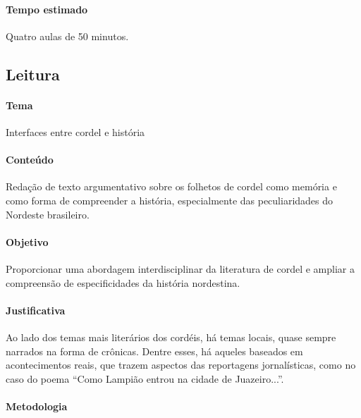 \documentclass[12pt]{extarticle}
\begin{document}
\paragraph{Tempo estimado} Quatro aulas de 50 minutos.



\subsection{Leitura}

\paragraph{Tema} Interfaces entre cordel e história

\paragraph{Conteúdo} Redação de texto argumentativo sobre os folhetos de cordel como memória e como forma de compreender a história, especialmente das peculiaridades do Nordeste brasileiro.

\paragraph{Objetivo} Proporcionar uma abordagem interdisciplinar da literatura de cordel e ampliar a compreensão de especificidades da história nordestina.

\paragraph{Justificativa} Ao lado dos temas mais literários dos cordéis, há temas locais, quase sempre narrados na forma de crônicas. Dentre esses, há aqueles baseados em acontecimentos reais, que trazem aspectos das reportagens jornalísticas, como no caso do poema ``Como Lampião entrou na cidade de Juazeiro...''.

\paragraph{Metodologia}
\end{document}
